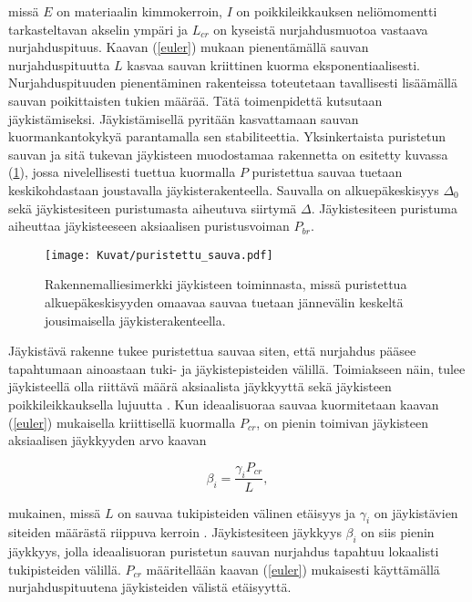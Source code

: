 \documentclass[12pt]{article}
\newenvironment{content}{\pagenumbering{arabic}}{}
\begin{document}
\begin{content}
missä $E$ on materiaalin kimmokerroin, $I$ on poikkileikkauksen neliömomentti tarkasteltavan akselin ympäri ja $L_{cr}$ on kyseistä nurjahdusmuotoa vastaava nurjahduspituus. Kaavan (\ref{euler}) mukaan pienentämällä sauvan nurjahduspituutta $L$ kasvaa sauvan kriittinen kuorma eksponentiaalisesti. Nurjahduspituuden pienentäminen rakenteissa toteutetaan tavallisesti lisäämällä sauvan poikittaisten tukien määrää. Tätä toimenpidettä kutsutaan jäykistämiseksi. Jäykistämisellä pyritään kasvattamaan sauvan kuormankantokykyä parantamalla sen stabiliteettia. Yksinkertaista puristetun sauvan ja sitä tukevan jäykisteen muodostamaa rakennetta on esitetty kuvassa (\ref{fig:puristettu_sauva}), jossa nivelellisesti tuettua kuormalla $P$ puristettua sauvaa tuetaan keskikohdastaan joustavalla jäykisterakenteella. Sauvalla on alkuepäkeskisyys $\Delta_0$ sekä jäykistesiteen puristumasta aiheutuva siirtymä $\Delta$. Jäykistesiteen puristuma aiheuttaa jäykisteeseen aksiaalisen puristusvoiman $P_{br}$.

\begin{figure}[htb]
\centering
\texttt{[image: Kuvat/puristettu\_sauva.pdf]}
\caption{Rakennemalliesimerkki jäykisteen toiminnasta, missä puristettua alkuepäkeskisyyden omaavaa sauvaa tuetaan jännevälin keskeltä jousimaisella jäykisterakenteella.}
\label{fig:puristettu_sauva}
\end{figure}

Jäykistävä rakenne tukee puristettua sauvaa siten, että nurjahdus pääsee tapahtumaan ainoastaan tuki- ja jäykistepisteiden välillä. Toimiakseen näin, tulee jäykisteellä olla riittävä määrä aksiaalista jäykkyyttä sekä jäykisteen poikkileikkauksella lujuutta \parencite{winter}. Kun ideaalisuoraa sauvaa kuormitetaan kaavan (\ref{euler}) mukaisella kriittisellä kuormalla $P_{cr}$, on pienin toimivan jäykisteen aksiaalisen jäykkyyden arvo kaavan

\begin{equation}
\label{ideaalijäykkyys}
\beta_i = \frac{\gamma_i P_{cr}}{L},
\end{equation}

mukainen, missä $L$ on sauvaa tukipisteiden välinen etäisyys ja $\gamma_i$ on jäykistävien siteiden määrästä riippuva kerroin \parencite[76]{timoshenko}. Jäykistesiteen jäykkyys $\beta_i$ on siis pienin jäykkyys, jolla ideaalisuoran puristetun sauvan nurjahdus tapahtuu lokaalisti tukipisteiden välillä. $P_{cr}$ määritellään kaavan (\ref{euler}) mukaisesti käyttämällä nurjahduspituutena jäykisteiden välistä etäisyyttä. 


\end{content}
\end{document}
